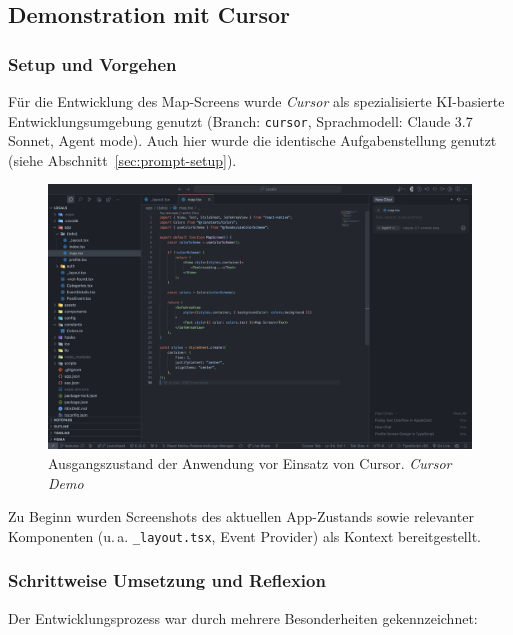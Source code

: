 \subsection{Demonstration mit Cursor}

\subsubsection{Setup und Vorgehen}
Für die Entwicklung des Map-Screens wurde \textit{Cursor} als spezialisierte
KI-basierte Entwicklungsumgebung genutzt (Branch: \texttt{cursor},
Sprachmodell: Claude 3.7 Sonnet, Agent mode). Auch hier wurde die identische
Aufgabenstellung genutzt (siehe Abschnitt~\ref{sec:prompt-setup}).

\begin{figure}[htbp]
      \centering
      \vspace{1em}
      \includegraphics[width=1\textwidth]{images/cursor_screenshots/Screenshots Ist-Zustand-cursor.png}
      \caption{Ausgangszustand der Anwendung vor Einsatz von Cursor. \textit{Cursor Demo}}
      \label{fig:cursor-istzustand}
\end{figure}

Zu Beginn wurden Screenshots des aktuellen App-Zustands sowie relevanter
Komponenten (u.\,a. \texttt{\_layout.tsx}, Event Provider) als Kontext
bereitgestellt.

\subsubsection{Schrittweise Umsetzung und Reflexion}

Der Entwicklungsprozess war durch mehrere Besonderheiten gekennzeichnet:

